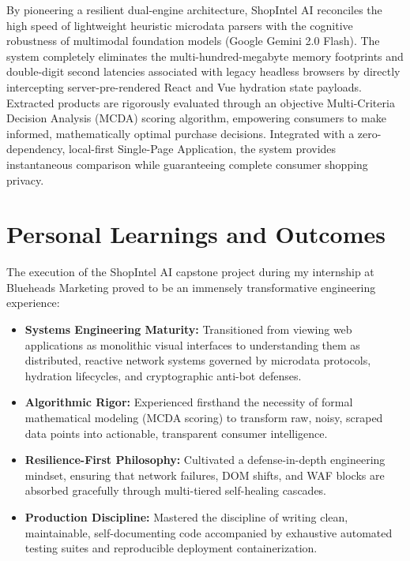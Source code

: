 \documentclass[12pt,a4paper,oneside]{report}
\begin{document}
By pioneering a resilient dual-engine architecture, ShopIntel AI reconciles the high speed of lightweight heuristic microdata parsers with the cognitive robustness of multimodal foundation models (Google Gemini 2.0 Flash). The system completely eliminates the multi-hundred-megabyte memory footprints and double-digit second latencies associated with legacy headless browsers by directly intercepting server-pre-rendered React and Vue hydration state payloads. Extracted products are rigorously evaluated through an objective Multi-Criteria Decision Analysis (MCDA) scoring algorithm, empowering consumers to make informed, mathematically optimal purchase decisions. Integrated with a zero-dependency, local-first Single-Page Application, the system provides instantaneous comparison while guaranteeing complete consumer shopping privacy.

\section{Personal Learnings and Outcomes}
The execution of the ShopIntel AI capstone project during my internship at Blueheads Marketing proved to be an immensely transformative engineering experience:
\begin{itemize}
    \item \textbf{Systems Engineering Maturity:} Transitioned from viewing web applications as monolithic visual interfaces to understanding them as distributed, reactive network systems governed by microdata protocols, hydration lifecycles, and cryptographic anti-bot defenses.
    \item \textbf{Algorithmic Rigor:} Experienced firsthand the necessity of formal mathematical modeling (MCDA scoring) to transform raw, noisy, scraped data points into actionable, transparent consumer intelligence.
    \item \textbf{Resilience-First Philosophy:} Cultivated a defense-in-depth engineering mindset, ensuring that network failures, DOM shifts, and WAF blocks are absorbed gracefully through multi-tiered self-healing cascades.
    \item \textbf{Production Discipline:} Mastered the discipline of writing clean, maintainable, self-documenting code accompanied by exhaustive automated testing suites and reproducible deployment containerization.
\end{itemize}
\end{document}
